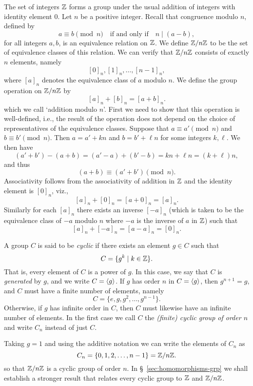 \begin{example}[\(\Z\) and \(\Z/n\Z\)]
    \label{def:z-and-zmodn}
    The set of integers \(\Z\) forms a group under the usual addition of
    integers with identity element \(0\). Let \(n\) be a positive integer.
    Recall that congruence modulo \(n\), defined by
    \[
        a \equiv b \pmod{n} \quad \text{if and only if} \quad n \mid (a - b),
    \]
    for all integers \(a, b\), is an equivalence relation on \(\Z\). We define
    \(\Z/n\Z\) to be the set of equivalence classes of this relation. We can
    verify that \(\Z/n\Z\) consists of exactly \(n\) elements, namely
    \[
        [0]_n, [1]_n, \ldots, [n - 1]_n,
    \]
    where \([a]_n\) denotes the equivalence class of \(a\) modulo \(n\). We
    define the group operation on \(\Z/n\Z\) by
    \[
        [a]_n + [b]_n = [a + b]_n.
    \]
    which we call `addition modulo \(n\)'.  First we need to show that this
    operation is well-defined, i.e., the result of the operation does not depend
    on the choice of representatives of the equivalence classes. Suppose that
    \(a \equiv a' \pmod{n}\) and \(b \equiv b' \pmod{n}\). Then \(a = a' + kn\)
    and \(b = b' + \ell n\) for some integers \(k, \ell\). We then have
    \[
        (a' + b') - (a + b) = (a' - a) + (b' - b) = kn + \ell n = (k + \ell)n,
    \]
    and thus
    \[
        (a + b) \equiv (a' + b') \pmod{n}.
    \]
    Associativity follows from the associativity of addition in \(\Z\) and the
    identity element is \([0]_n\), viz.,
    \[
        [a]_n + [0]_n = [a + 0]_n = [a]_n.
    \]
    Similarly for each \([a]_n\) there exists an inverse \([-a]_n\) (which is
    taken to be the equivalence class of \(-a\) modulo \(n\) where \(-a\) is the
    inverse of \(a\) in \(\Z\)) such that
    \[
        [a]_n + [-a]_n = [a - a]_n = [0]_n.
    \]
\end{example}

\begin{example}
    A group \(C\) is said to be \emph{cyclic} if there exists an element \(g \in
    C\) such that
    \[
        C = \{g^k \mid k \in \mathbb{Z}\}.
    \]
    That is, every element of \(C\) is a power of \(g\). In this case, we say
    that \(C\) is \emph{generated} by \(g\), and we write \(C = \langle g \rangle\). If
    \(g\) has order \(n\) in \(C = \langle g \rangle\), then \(g^{n+1} = g\), and \(C\)
    must have a finite number of elements, namely
    \[
        C = \{e, g, g^2, \ldots, g^{n - 1}\}.
    \]
    Otherwise, if \(g\) has infinite order in \(C\), then \(C\) must likewise
    have an infinite number of elements. In the first case we call \(C\) the
    \emph{(finite) cyclic group of order \(n\)} and write \(C_n\) instead of
    just \(C\).

    Taking \(g = 1\) and using the additive notation we can write the elements
    of \(C_n\) as
    \[
        C_n = \{0, 1, 2, \ldots, n - 1\} = \mathbb{Z}/n\mathbb{Z}.
    \]
    so that \(\Z/n\Z\) is a cyclic group of order \(n\). In
    \S~\ref{sec:homomorphisms-grp} we shall establish a stronger result that
    relates every cyclic group to \(\Z\) and \(\Z/n\Z\).
\end{example}


